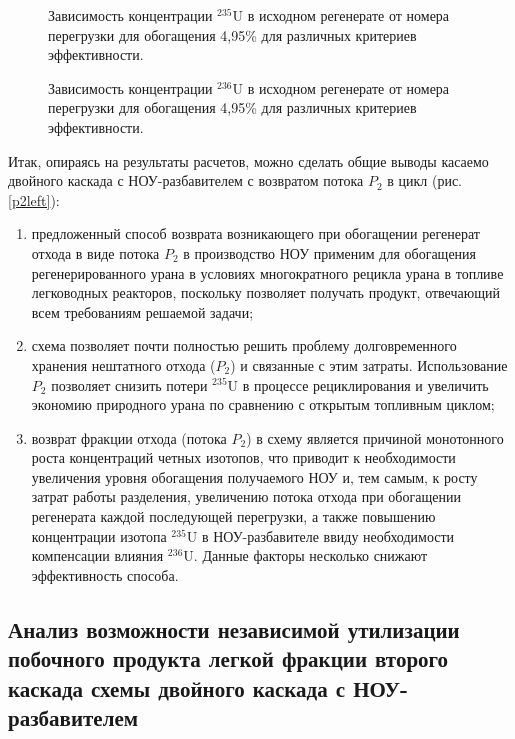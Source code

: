 \begin{figure}[ht]
    \centering
    \begin{minipage}{.5\textwidth}
      \centering
      
      \caption{{Зависимость концентрации $^{235}$U в исходном регенерате от номера перегрузки для обогащения 4,95\% для различных критериев эффективности.{\label{10}}}}
    \end{minipage}%
    \begin{minipage}{.5\textwidth}
      \centering
      
\caption{{Зависимость концентрации $^{236}$U в исходном регенерате от номера перегрузки для обогащения 4,95\% для различных критериев эффективности.{\label{11}}}}
\end{minipage}
\end{figure}


Итак, опираясь на результаты расчетов, можно сделать общие выводы касаемо двойного каскада с НОУ-разбавителем с возвратом потока $P_2$ в цикл (рис. \ref{p2left}):

\begin{enumerate}
    \item предложенный способ возврата возникающего при обогащении регенерат отхода в виде потока $P_2$ в производство НОУ применим для обогащения регенерированного урана в условиях многократного рецикла урана в топливе легководных реакторов, поскольку позволяет получать продукт, отвечающий всем требованиям решаемой задачи;
    \item схема позволяет почти полностью решить проблему долговременного хранения нештатного отхода ($P_2$) и связанные с этим затраты. Использование $P_2$ позволяет снизить потери $^{235}$U в процессе рециклирования и увеличить экономию природного урана по сравнению с открытым топливным циклом;
     \item возврат фракции отхода (потока $P_2$) в схему является причиной монотонного роста концентраций четных изотопов, что приводит к необходимости увеличения уровня обогащения получаемого НОУ и, тем самым, к росту затрат работы разделения, увеличению потока отхода при обогащении регенерата каждой последующей перегрузки, а также повышению концентрации изотопа $^{235}$U в НОУ-разбавителе ввиду необходимости компенсации влияния $^{236}$U. Данные факторы несколько снижают эффективность способа.
\end{enumerate}




\subsection{Анализ возможности независимой утилизации побочного продукта легкой фракции второго каскада схемы двойного каскада с НОУ-разбавителем}

